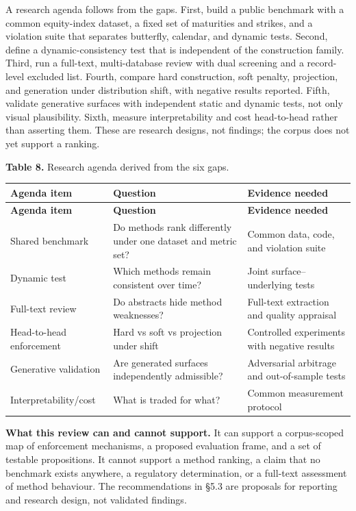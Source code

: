 \documentclass[11pt]{article}
\begin{document}
A research agenda follows from the gaps. First, build a public benchmark with a common equity-index dataset, a fixed set of maturities and strikes, and a violation suite that separates butterfly, calendar, and dynamic tests. Second, define a dynamic-consistency test that is independent of the construction family. Third, run a full-text, multi-database review with dual screening and a record-level excluded list. Fourth, compare hard construction, soft penalty, projection, and generation under distribution shift, with negative results reported. Fifth, validate generative surfaces with independent static and dynamic tests, not only visual plausibility. Sixth, measure interpretability and cost head-to-head rather than asserting them. These are research designs, not findings; the corpus does not yet support a ranking.

\textbf{Table 8.} Research agenda derived from the six gaps.

\begingroup
\begin{longtable}{@{}p{}p{}p{}@{}}
\toprule
\textbf{Agenda item} & \textbf{Question} & \textbf{Evidence needed} \\
\midrule
\endfirsthead
\toprule
\textbf{Agenda item} & \textbf{Question} & \textbf{Evidence needed} \\
\midrule
\endhead
Shared benchmark & Do methods rank differently under one dataset and metric set? & Common data, code, and violation suite \\
Dynamic test & Which methods remain consistent over time? & Joint surface–underlying tests \\
Full-text review & Do abstracts hide method weaknesses? & Full-text extraction and quality appraisal \\
Head-to-head enforcement & Hard vs soft vs projection under shift & Controlled experiments with negative results \\
Generative validation & Are generated surfaces independently admissible? & Adversarial arbitrage and out-of-sample tests \\
Interpretability/cost & What is traded for what? & Common measurement protocol \\
\bottomrule
\end{longtable}
\endgroup

\textbf{What this review can and cannot support.} It can support a corpus-scoped map of enforcement mechanisms, a proposed evaluation frame, and a set of testable propositions. It cannot support a method ranking, a claim that no benchmark exists anywhere, a regulatory determination, or a full-text assessment of method behaviour. The recommendations in \S 5.3 are proposals for reporting and research design, not validated findings.
\end{document}
